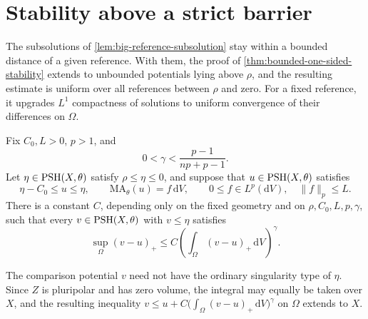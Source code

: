 \section{Stability above a strict barrier}
\label{sec:big-reference-stability}

The subsolutions of \cref{lem:big-reference-subsolution} stay within a bounded distance of a given reference. With them, the proof of \cref{thm:bounded-one-sided-stability} extends to unbounded potentials lying above $\rho$, and the resulting estimate is uniform over all references between $\rho$ and zero. For a fixed reference, it upgrades $L^1$ compactness of solutions to uniform convergence of their differences on $\Omega$.

\begin{theorem}\label{thm:big-reference-one-sided-stability}
Fix $C_0,L>0$, $p>1$, and
\[
 0<\gamma<\frac{p-1}{np+p-1}.
\]
Let $\eta\in\mathrm{PSH}(X,\theta)$ satisfy $\rho\leq\eta\leq0$, and suppose that $u\in\mathrm{PSH}(X,\theta)$ satisfies
\[
 \eta-C_0\leq u\leq\eta,\qquad
 \mathrm{MA}_\theta(u)=f\,\mathrm{d}V,\qquad 0\leq f\in L^p(\mathrm{d}V),
 \quad\|f\|_p\leq L.
\]
There is a constant $C$, depending only on the fixed geometry and on $\rho,C_0,L,p,\gamma$, such that every $v\in\mathrm{PSH}(X,\theta)$ with $v\leq\eta$ satisfies
\begin{equation}\label{eq:big-reference-stability}
 \sup_\Omega(v-u)_+
 \leq C\left(\int_\Omega(v-u)_+\,\mathrm{d}V\right)^\gamma.
\end{equation}
\end{theorem}

The comparison potential $v$ need not have the ordinary singularity type of $\eta$. Since $Z$ is pluripolar and has zero volume, the integral may equally be taken over $X$, and the resulting inequality $v\leq u+C\bigl(\int_\Omega(v-u)_+\,\mathrm{d}V\bigr)^\gamma$ on $\Omega$ extends to $X$.

